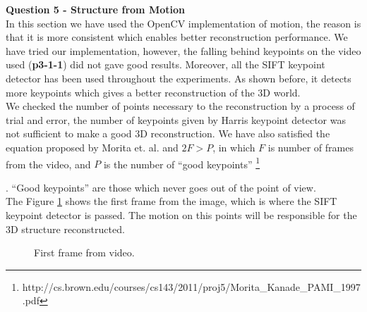 \documentclass[12pt,a4paper]{article}
\newcommand\blfootnote[1]{%
	\begingroup
	\renewcommand\thefootnote{}\footnote{#1}%
	\addtocounter{footnote}{-1}%
	\endgroup
}
\begin{document}

\newpage

\textbf{\LARGE Question 5 - Structure from Motion} \\

In this section we have used the OpenCV implementation of motion, the reason is that it is more consistent which enables better reconstruction performance. We have tried our implementation, however, the falling behind keypoints on the video used (\textbf{p3-1-1}) did not gave good results. Moreover, all the SIFT keypoint detector has been used throughout the experiments. As shown before, it detects more keypoints which gives a better reconstruction of the 3D world. \\

We checked the number of points necessary to the reconstruction by a process of trial and error, the number of keypoints given by Harris keypoint detector was not sufficient to make a good 3D reconstruction. We have also satisfied the equation proposed by Morita et. al. and  $2F > P$, in which $F$ is number of frames from the video, and $P$ is the number of ``good keypoints'' \blfootnote{http://cs.brown.edu/courses/cs143/2011/proj5/Morita\_Kanade\_PAMI\_1997.pdf}. ``Good keypoints'' are those which never goes out of the point of view. \\

The Figure \ref{fig:3dframe} shows the first frame from the image, which is where the SIFT keypoint detector is passed. The motion on this points will be responsible for the 3D structure reconstructed. 

\begin{figure}[!h]
	\centering
	{
		\setlength{\fboxsep}{1pt}
		\setlength{\fboxrule}{1pt}
	}
	\caption{First frame from video.}
	\label{fig:3dframe}
\end{figure}
\end{document}
